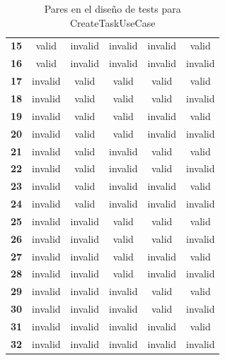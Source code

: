 \begin{table}[H]
\begin{tabular}{cccccc}
        \textbf{15} & valid         & invalid       & invalid                    & invalid                & valid              \\
        \textbf{16} & valid         & invalid       & invalid                    & invalid                & invalid            \\
        \textbf{17} & invalid       & valid         & valid                      & valid                  & valid              \\
        \textbf{18} & invalid       & valid         & valid                      & valid                  & invalid            \\
        \textbf{19} & invalid       & valid         & valid                      & invalid                & valid              \\
        \textbf{20} & invalid       & valid         & valid                      & invalid                & invalid            \\
        \textbf{21} & invalid       & valid         & invalid                    & valid                  & valid              \\
        \textbf{22} & invalid       & valid         & invalid                    & valid                  & invalid            \\
        \textbf{23} & invalid       & valid         & invalid                    & invalid                & valid              \\
        \textbf{24} & invalid       & valid         & invalid                    & invalid                & invalid            \\
        \textbf{25} & invalid       & invalid       & valid                      & valid                  & valid              \\
        \textbf{26} & invalid       & invalid       & valid                      & valid                  & invalid            \\
        \textbf{27} & invalid       & invalid       & valid                      & invalid                & valid              \\
        \textbf{28} & invalid       & invalid       & valid                      & invalid                & invalid            \\
        \textbf{29} & invalid       & invalid       & invalid                    & valid                  & valid              \\
        \textbf{30} & invalid       & invalid       & invalid                    & valid                  & invalid            \\
        \textbf{31} & invalid       & invalid       & invalid                    & invalid                & valid              \\
        \textbf{32} & invalid       & invalid       & invalid                    & invalid                & invalid
    \end{tabular}
    \caption{Pares en el diseño de tests para CreateTaskUseCase}\label{tab:pairsCreateTaskUseCase}
\end{table}

